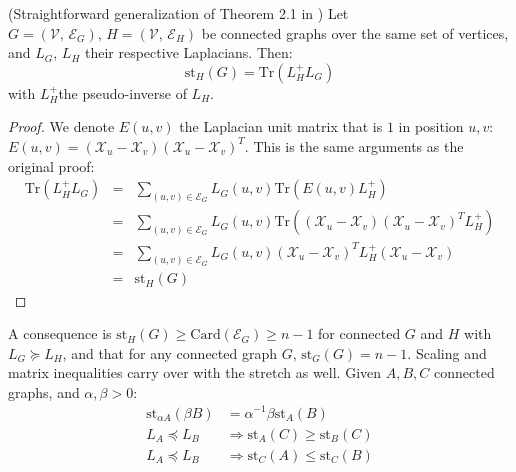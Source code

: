 \begin{lemma}\label{lem:stretch-trace}(Straightforward generalization
of Theorem 2.1 in \cite{Spielman2009b}) Let $G=\left(\mathcal{V},\,\mathcal{E}_{G}\right),\, H=\left(\mathcal{V},\,\mathcal{E}_{H}\right)$
be connected graphs over the same set of vertices, and $L_{G}$, $L_{H}$
their respective Laplacians. Then:
\[
\text{st}_{H}\left(G\right)=\text{Tr}\left(L_{H}^{+}L_{G}\right)
\]
with $L_{H}^{+}$the pseudo-inverse of $L_{H}$.

\end{lemma}

\begin{proof}

We denote $E\left(u,v\right)$ the Laplacian unit matrix that is $1$
in position $u,v$: $E\left(u,v\right)=\left(\mathcal{X}_{u}-\mathcal{X}_{v}\right)\left(\mathcal{X}_{u}-\mathcal{X}_{v}\right)^{T}$.
This is the same arguments as the original proof:
\begin{eqnarray*}
\text{Tr}\left(L_{H}^{+}L_{G}\right) & = & \sum_{\left(u,v\right)\in\mathcal{E}_{G}}L_{G}\left(u,v\right)\text{Tr}\left(E\left(u,v\right)L_{H}^{+}\right)\\
 & = & \sum_{\left(u,v\right)\in\mathcal{E}_{G}}L_{G}\left(u,v\right)\text{Tr}\left(\left(\mathcal{X}_{u}-\mathcal{X}_{v}\right)\left(\mathcal{X}_{u}-\mathcal{X}_{v}\right)^{T}L_{H}^{+}\right)\\
 & = & \sum_{\left(u,v\right)\in\mathcal{E}_{G}}L_{G}\left(u,v\right)\left(\mathcal{X}_{u}-\mathcal{X}_{v}\right)^{T}L_{H}^{+}\left(\mathcal{X}_{u}-\mathcal{X}_{v}\right)\\
 & = & \text{st}_{H}\left(G\right)
\end{eqnarray*}


\end{proof}

A consequence is $\text{st}_{H}\left(G\right)\geq\text{Card}\left(\mathcal{E}_{G}\right)\geq n-1$
for connected $G$ and $H$ with $L_{G}\succeq L_{H}$, and that for
any connected graph $G$, $\text{st}_{G}\left(G\right)=n-1$. Scaling
and matrix inequalities carry over with the stretch as well. Given
$A,B,C$ connected graphs, and $\alpha,\beta>0$:
\begin{align*}
\text{st}_{\alpha A}\left(\beta B\right) &=\alpha^{-1}\beta\text{st}_{A}\left(B\right)\\
L_{A}\preceq L_{B}&\Rightarrow\text{st}_{A}\left(C\right)\geq\text{st}_{B}\left(C\right)\\
L_{A}\preceq L_{B}&\Rightarrow\text{st}_{C}\left(A\right)\leq\text{st}_{C}\left(B\right)
\end{align*}



